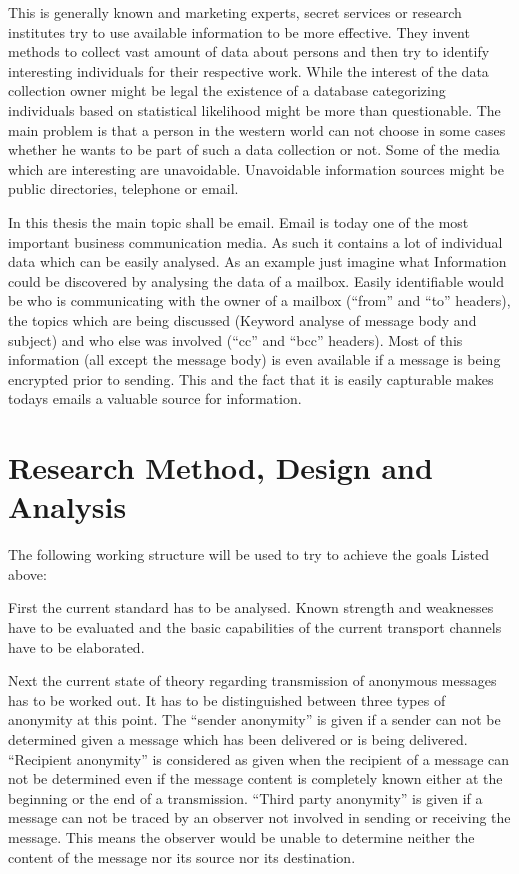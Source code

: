\documentclass[twocolumn,a4paper]{article}
\begin{document}
This is generally known and marketing experts, secret services or research institutes try to use available information to be more effective. They invent methods to collect vast amount of data about persons and then try to identify interesting individuals for their respective work. While the interest of the data collection owner might be legal the existence of a database categorizing individuals based on statistical likelihood might be more than questionable. The main problem is that a person in the western world can not choose in some cases whether he wants to be part of such a data collection or not. Some of the media which are interesting are unavoidable. Unavoidable information sources might be public directories, telephone or email.\par

In this thesis the main topic shall be email. Email is today one of the most important business communication media. As such it contains a lot of individual data which can be easily analysed. As an example just imagine what Information could be discovered by analysing the data of a mailbox. Easily identifiable would be who is communicating with the owner of a mailbox ("`from"' and "`to"' headers), the topics which are being discussed (Keyword analyse of message body and subject) and who else was involved ("`cc"' and "`bcc"' headers). Most of this information (all except the message body) is even available if a message is being encrypted prior to sending. This and the fact that it is easily capturable makes todays emails a valuable source for information.\par

\section{Research Method, Design and Analysis}
The following working structure will be used to try to achieve the goals Listed above:\par

First the current standard has to be analysed. Known strength and weaknesses have to be evaluated and the basic capabilities of the current transport channels have to be elaborated. \par

Next the current state of theory regarding transmission of anonymous messages has to be worked out. It has to be distinguished between three types of anonymity at this point. The "`sender anonymity"' is given if a sender can not be determined given a message which has been delivered or is being delivered. "`Recipient anonymity"' is considered as given when the recipient of a message can not be determined even if the message content is completely known either at the beginning or the end of a transmission. "`Third party anonymity"' is given if a message can not be traced by an observer not involved in sending or receiving the message. This means the observer would be unable to determine neither the content of the message nor its source nor its destination. \par
\end{document}
